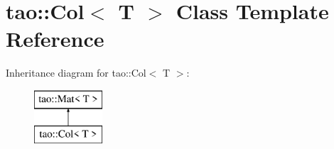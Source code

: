 \hypertarget{classtao_1_1_col}{}\section{tao\+::Col$<$ T $>$ Class Template Reference}
\label{classtao_1_1_col}
Inheritance diagram for tao\+::Col$<$ T $>$\+:\begin{figure}[H]
\begin{center}
\leavevmode
\includegraphics[height=2.000000cm]{classtao_1_1_col}
\end{center}
\end{figure}
